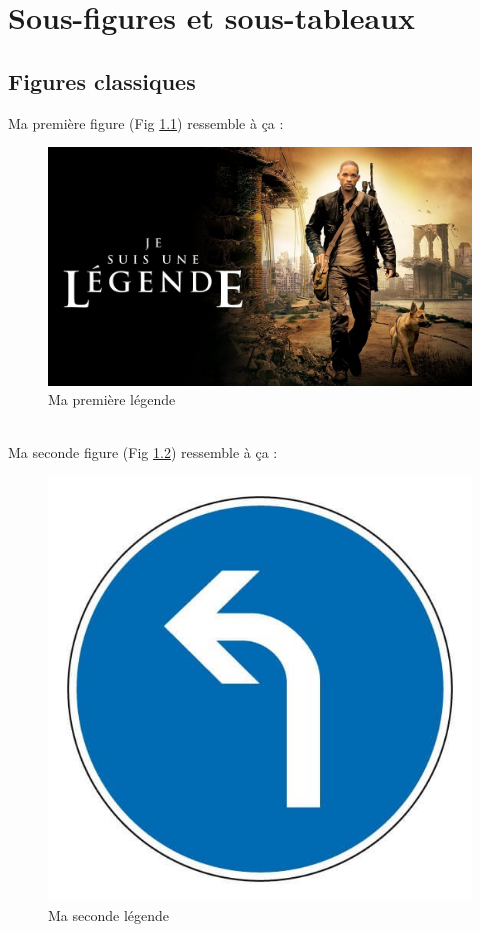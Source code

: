 \documentclass[a4paper, 13pt]{report} %
\begin{document}
	
	
	
	
	
	
	
	
	
	
	
	
	
	
	
	\chapter{Sous-figures et sous-tableaux}
		\section{Figures classiques}
			Ma première figure (Fig \ref{fig:premiere}) ressemble à ça :
				\begin{figure}[h]\centering
					\includegraphics[width=.5\textwidth]{legende.jpg}
					\caption{Ma première légende}
					\label{fig:premiere}
				\end{figure}
			\\Ma seconde figure (Fig \ref{fig:seconde}) ressemble à ça :
				\begin{figure}[h]\centering
					\includegraphics[width=.3\textwidth]{gauche.jpg}
					\caption{Ma seconde légende}
					\label{fig:seconde}
				\end{figure}
			
\end{document}
